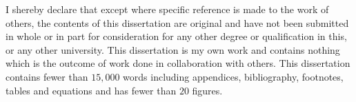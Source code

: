 
\begin{declaration}

I shereby declare that except where specific reference is made to the work of 
others, the contents of this dissertation are original and have not been 
submitted in whole or in part for consideration for any other degree or 
qualification in this, or any other university. This dissertation is my own 
work and contains nothing which is the outcome of work done in collaboration 
with others. This dissertation contains fewer than $15,000$ words including appendices, 
bibliography, footnotes, tables and equations and has fewer than  $20$ figures.

\vspace{5em}



\end{declaration}

